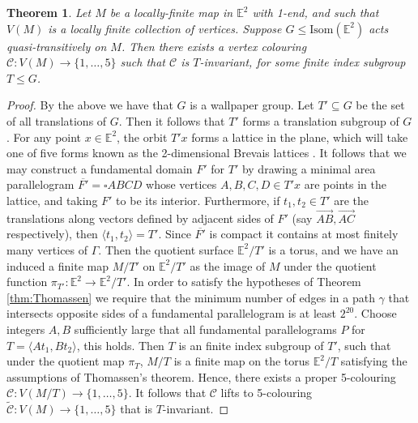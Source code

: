 \documentclass{article}
\numberwithin{equation}{section}
\newcommand{\EE}{\mathbb{E}}
\newtheorem{theorem}[lemma]{Theorem}
\theoremstyle{definition}
\theoremstyle{remark}
\newtheorem{remark}{Remark}[section]
\begin{document}
\begin{theorem}\label{thm:main_Euclid}
    Let $M$ be a locally-finite map in $\EE^2$ with 1-end, and such that $V(M)$ is a locally finite collection of vertices. Suppose $G\leq \text{Isom}(\EE^2)$ acts quasi-transitively on $M$. Then there exists a vertex colouring $\mathcal{C}:V(M)\rightarrow \{1,\ldots,5\}$ such that $\mathcal{C}$ is $T$-invariant, for some finite index subgroup $T\leq G$.
\end{theorem}
\begin{proof}
  By the above we have that $G$ is a wallpaper group. Let $T'\subseteq G$ be the set of all translations of $G$. Then it follows that $T'$ forms a translation subgroup of $G$. For any point $x\in\EE^2$, the orbit $T'x$ forms a lattice in the plane, which will take one of five forms known as the 2-dimensional Brevais lattices \cite{Schattschneider}. It follows that we may construct a fundamental domain $F'$ for $T'$ by drawing a minimal area parallelogram $\overline{F'}=\square ABCD$ whose vertices $A,B,C,D\in T'x$ are points in the lattice, and taking $F'$ to be its interior. Furthermore, if $t_1,t_2\in T'$ are the translations along vectors defined by adjacent sides of $F'$ (say $\overrightarrow{AB},\overrightarrow{AC}$ respectively), then $\langle t_1,t_2\rangle = T'$. Since $\overline{F'}$ is compact it contains at most finitely many vertices of $\Gamma$.
  Then the quotient surface $\EE^2/T'$ is a torus, and we have an induced a finite map $M/T'$ on $\EE^2/T'$ as the image of $M$ under the quotient function $\pi_{T'}:\EE^2\rightarrow \EE^2/T'$.
  In order to satisfy the hypotheses of Theorem \ref{thm:Thomassen} we require that the minimum number of edges in a path $\gamma$ that intersects opposite sides of a fundamental parallelogram is at least $2^{20}$. Choose integers $A,B$ sufficiently large that all fundamental parallelograms $P$ for $T=\langle At_1,Bt_2\rangle$, this holds. Then $T$ is an finite index subgroup of $T'$, such that under the quotient map $\pi_T$, $M/T$ is a finite map on the torus $\EE^2/T$ satisfying the assumptions of Thomassen's theorem. Hence, there exists a proper 5-colouring $\mathcal{C}:V(M/T)\rightarrow\{1,\ldots,5\}$. It follows that $\mathcal{C}$ lifts to 5-colouring $\widetilde{\mathcal{C}}:V(M)\rightarrow \{1,\ldots,5\}$ that is $T$-invariant.
\end{proof}

\end{document}
